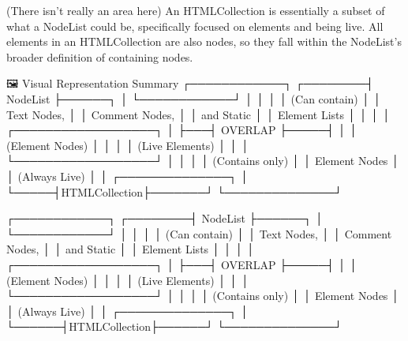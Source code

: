 (There isn't really an area here) An HTMLCollection is essentially a subset of what a NodeList could be, specifically focused on elements and being live. All elements in an HTMLCollection are also nodes, so they fall within the NodeList's broader definition of containing nodes.

🖼️ Visual Representation Summary
                      ┌────────────┐
             ┌────────┤  NodeList  ├──────┐
             │        └────────────┘      │
             │                            │
             │  (Can contain)             │
             │   Text Nodes,              │
             │   Comment Nodes,           │
             │   and Static               │
             │   Element Lists            │
             │                            │
             │   ┌──────────────────┐     │
             ├───┤   OVERLAP        ├─────┤
             │   │ (Element Nodes)  │     │
             │   │ (Live Elements)  │     │
             │   └──────────────────┘     │
             │                            │
             │    (Contains only)         │
             │     Element Nodes          │
             │     (Always Live)          │
             │     ┌──────────────┐       │
             └─────┤HTMLCollection├───────┘
                   └──────────────┘




                                         ┌────────────┐
                                ┌────────┤  NodeList  ├──────┐
                                │        └────────────┘      │
                                │                            │
                                │      (Can contain)         │
                                │       Text Nodes,          │
                                │      Comment Nodes,        │
                                │      and Static            │
                                │      Element Lists         │
                                │                            │
                                │   ┌──────────────────┐     │
                                ├───┤   OVERLAP        ├─────┤
                                │   │ (Element Nodes)  │     │
                                │   │ (Live Elements)  │     │
                                │   └──────────────────┘     │
                                │                            │
                                │      (Contains only)       │
                                │       Element Nodes        │
                                │       (Always Live)        │
                                │      ┌──────────────┐      │
                                └──────┤HTMLCollection├──────┘
                                       └──────────────┘